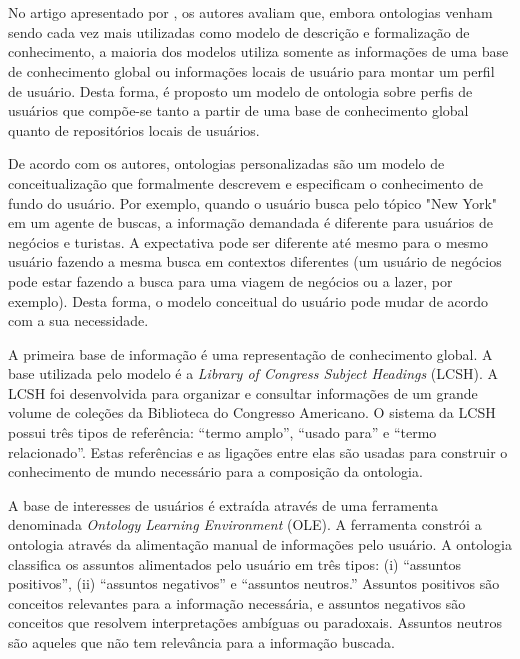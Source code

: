 
\section{}

No artigo apresentado por , os autores avaliam que, embora ontologias venham sendo cada vez mais utilizadas como modelo de descrição e formalização de conhecimento, a maioria dos modelos utiliza somente as informações de uma base de conhecimento global ou informações locais de usuário para montar um perfil de usuário. Desta forma, é proposto um modelo de ontologia sobre perfis de usuários que compõe-se tanto a partir de uma base de conhecimento global quanto de repositórios locais de usuários.

De acordo com os autores, ontologias personalizadas são um modelo de conceitualização que formalmente descrevem e especificam o conhecimento de fundo do usuário. Por exemplo, quando o usuário busca pelo tópico "New York" em um agente de buscas, a informação demandada é diferente para usuários de negócios e turistas. A expectativa pode ser diferente até mesmo para o mesmo usuário fazendo a mesma busca em contextos diferentes (um usuário de negócios pode estar fazendo a busca para uma viagem de negócios ou a lazer, por exemplo). Desta forma, o modelo conceitual do usuário pode mudar de acordo com a sua necessidade.

A primeira base de informação é uma representação de conhecimento global. A base utilizada pelo modelo é a {\it Library of Congress Subject Headings} (LCSH). A LCSH foi desenvolvida para organizar e consultar informações de um grande volume de coleções da Biblioteca do Congresso Americano. O sistema da LCSH possui três tipos de referência: ``termo amplo'', ``usado para'' e ``termo relacionado''. Estas referências e as ligações entre elas são usadas para construir o conhecimento de mundo necessário para a composição da ontologia.

A base de interesses de usuários é extraída através de uma ferramenta denominada {\it Ontology Learning Environment} (OLE). A ferramenta constrói a ontologia através da alimentação manual de informações pelo usuário. A ontologia classifica os assuntos alimentados pelo usuário em três tipos: (i) ``assuntos positivos'', (ii) ``assuntos negativos'' e ``assuntos neutros.'' Assuntos positivos são conceitos relevantes para a informação necessária, e assuntos negativos são conceitos que resolvem interpretações ambíguas ou paradoxais. Assuntos neutros são aqueles que não tem relevância para a informação buscada.

